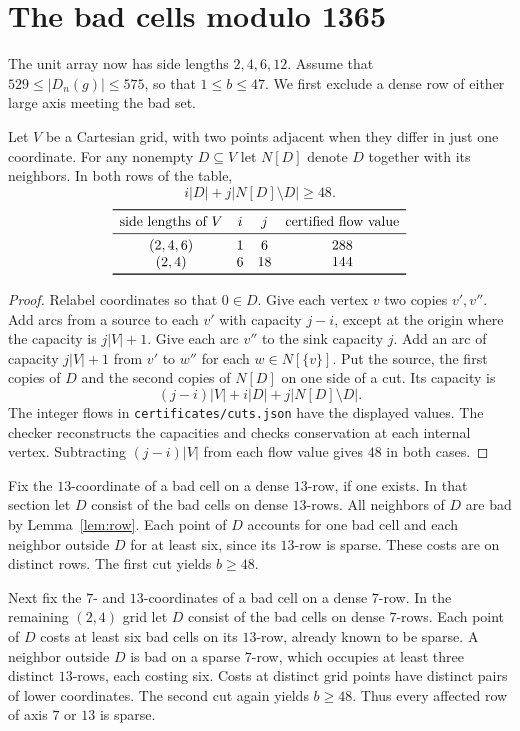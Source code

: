 \section{The bad cells modulo 1365}
The unit array now has side lengths $2,4,6,12$. Assume that $529\le |D_n(g)|\le575$, so that $1\le b\le47$. We first exclude a dense row of either large axis meeting the bad set.

\begin{lemma}\label{lem:cut}
Let $V$ be a Cartesian grid, with two points adjacent when they differ in just one coordinate. For any nonempty $D\subseteq V$ let $N[D]$ denote $D$ together with its neighbors. In both rows of the table,
\[
 i|D|+j|N[D]\setminus D|\ge 48.
\]
\[
\begin{array}{cccc}
\toprule \text{side lengths of } V & i & j & \text{certified flow value}\\
\midrule (2,4,6)&1&6&288\\ (2,4)&6&18&144\\ \bottomrule
\end{array}
\]
\end{lemma}
\begin{proof}
Relabel coordinates so that $0\in D$. Give each vertex $v$ two copies $v',v''$. Add arcs from a source to each $v'$ with capacity $j-i$, except at the origin where the capacity is $j|V|+1$. Give each arc $v''$ to the sink capacity $j$. Add an arc of capacity $j|V|+1$ from $v'$ to $w''$ for each $w\in N[\{v\}]$. Put the source, the first copies of $D$ and the second copies of $N[D]$ on one side of a cut. Its capacity is
\[
 (j-i)|V|+i|D|+j|N[D]\setminus D|.
\]
The integer flows in \texttt{certificates/cuts.json} have the displayed values. The checker reconstructs the capacities and checks conservation at each internal vertex. Subtracting $(j-i)|V|$ from each flow value gives $48$ in both cases.
\end{proof}

Fix the $13$-coordinate of a bad cell on a dense $13$-row, if one exists. In that section let $D$ consist of the bad cells on dense $13$-rows. All neighbors of $D$ are bad by Lemma~\ref{lem:row}. Each point of $D$ accounts for one bad cell and each neighbor outside $D$ for at least six, since its $13$-row is sparse. These costs are on distinct rows. The first cut yields $b\ge48$.

Next fix the $7$- and $13$-coordinates of a bad cell on a dense $7$-row. In the remaining $(2,4)$ grid let $D$ consist of the bad cells on dense $7$-rows. Each point of $D$ costs at least six bad cells on its $13$-row, already known to be sparse. A neighbor outside $D$ is bad on a sparse $7$-row, which occupies at least three distinct $13$-rows, each costing six. Costs at distinct grid points have distinct pairs of lower coordinates. The second cut again yields $b\ge48$. Thus every affected row of axis $7$ or $13$ is sparse.


